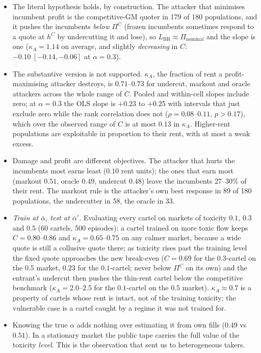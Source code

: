 \documentclass[11pt]{article}
\begin{document}
\begin{itemize}
\item The literal hypothesis holds, by construction. The attacker that minimises incumbent profit is the competitive-GM quoter in 179 of 180 populations, and it pushes the incumbents \emph{below} $\Pi^C$ (frozen incumbents sometimes respond to a quote at $h^C$ by undercutting it and lose), so $L_{\mathrm{BR}}\approx\Pi_{\mathrm{nominal}}$ and the slope is one ($\kappa_A=1.14$ on average, and slightly \emph{decreasing} in $C$: $-0.10\ [-0.14,-0.06]$ at $\alpha=0.3$).
\item The substantive version is not supported. $\kappa_A$, the fraction of rent a profit-maximising attacker destroys, is $0.71$--$0.73$ for undercut, markout and oracle attackers across the whole range of $C$. Pooled and within-cell slopes include zero; at $\alpha=0.3$ the OLS slope is $+0.23$ to $+0.25$ with intervals that just exclude zero while the rank correlation does not ($\rho=0.08$--$0.11$, $p>0.17$), which over the observed range of $C$ is at most $0.13$ in $\kappa_A$. Higher-rent populations are exploitable in proportion to their rent, with at most a weak excess.
\item Damage and profit are different objectives. The attacker that hurts the incumbents most earns least ($0.10$ rent units); the ones that earn most (markout $0.51$, oracle $0.49$, undercut $0.48$) leave the incumbents 27--30\% of their rent. The markout rule is the attacker's own best response in 89 of 180 populations, the undercutter in 58, the oracle in 33.
\item \emph{Train at $\bar\alpha$, test at $\bar\alpha'$.} Evaluating every cartel on markets of toxicity $0.1$, $0.3$ and $0.5$ (60 cartels, 500 episodes): a cartel trained on more toxic flow keeps $C=0.80$--$0.86$ and $\kappa_A=0.65$--$0.75$ on any calmer market, because a wide quote is still a collusive quote there; as toxicity rises past the training level the fixed quote approaches the new break-even ($C=0.69$ for the $0.3$-cartel on the $0.5$ market, $0.23$ for the $0.1$-cartel; never below $\Pi^C$ on its own) and the entrant's undercut then pushes the thin-rent cartel below the competitive benchmark ($\kappa_A=2.0$--$2.5$ for the $0.1$-cartel on the $0.5$ market). $\kappa_A\approx0.7$ is a property of cartels whose rent is intact, not of the training toxicity; the vulnerable case is a cartel caught by a regime it was not trained for.
\item Knowing the true $\alpha$ adds nothing over estimating it from own fills ($0.49$ vs $0.51$). In a stationary market the public tape carries the full value of the toxicity \emph{level}. This is the observation that sent us to heterogeneous takers.
\end{itemize}
\end{document}
